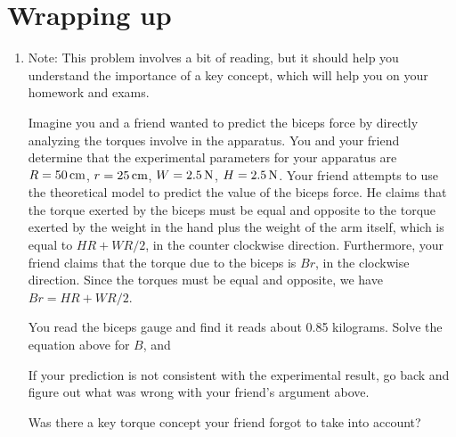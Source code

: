 \section*{Wrapping up}
\begin{enumerate}[labproc]
	\item 
		Note:  This problem involves a bit of reading,
		but it should help you understand the importance of a key
		concept, which will help you on your homework and exams.

		Imagine you and a friend wanted to predict the biceps force by 
		directly analyzing the torques involve in the apparatus.
		You and your friend determine that the experimental parameters for
		your apparatus are 
		$R=50\,\mathrm{cm}$, $r=25\,\mathrm{cm}$,
		$W=2.5\,\mathrm{N}$, $H=2.5\,\mathrm{N}$.
		Your friend attempts to use the theoretical model
		to predict the value of the biceps force.
		He claims that the torque exerted by the biceps must be equal and 
		opposite to the torque exerted by the weight in the hand
		plus the weight of the arm itself, 
		which is equal to $H R + W R/2$, in the counter clockwise direction.
		Furthermore, your friend claims that the torque due to
		the biceps is $B r$, in the clockwise direction.
		Since the torques must be equal and opposite, we have
		$Br=HR+WR/2$.

		You read the biceps gauge and find it reads about 0.85 kilograms.
		Solve the equation above for $B$, and 

		If your prediction is not consistent with the experimental result, 
		go back and figure out what was wrong with your friend's argument
		above.  

		Was there a key torque concept 
		your friend forgot to take into account?


\end{enumerate}

